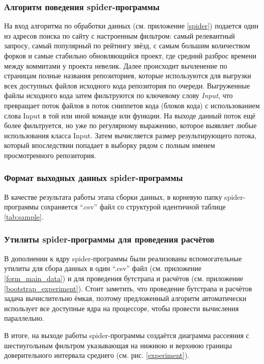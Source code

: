 \subsubsection*{Алгоритм поведения spider-программы}
На вход алгоритма по обработки данных (см. приложение \ref{spider}) подается один из адресов поиска по сайту с настроенным фильтром: самый релевантный запросу, самый популярный по рейтингу звёзд, с самым большим количеством форков и самые стабильно обновляющийся проект, где средний разброс времени между коммитами у проекта невелик. Далее происходит вычленение по страницам полные названия репозиториев, которые используются для выгрузки всех доступных файлов исходного кода репозитория по очереди. Выгруженные файлы исходного кода затем фильтруются по ключевому слову \textit{Input}, что превращает поток файлов в поток сниппетов кода (блоков кода) с использованием слова Input в той или иной команде или функции. На выходе данный поток ещё более фильтруется, но уже по регулярному выражению, которое выявляет любые использования класса Input. Затем вычисляется размер результирующего потока, который впоследствии попадает в выборку рядом с полным именем просмотренного репозитория.

\subsubsection*{Формат выходных данных spider-программы}
В качестве результата работы этапа сборки данных, в корневую папку spider-программы сохраняется ``.csv'' файл со структурой идентичной таблице \ref{tab:sample}.

\subsubsection*{Утилиты spider-программы для проведения расчётов}
В дополнении к ядру spider-программы были реализованы вспомогательные утилиты для сбора данных в один ``.csv'' файл (см. приложение \ref{form_main_data}) и для проведения бутстрапа и расчётов (см. приложение \ref{bootstrap_experiment}). Стоит заметить, что проведение бутстрапа и расчётов задача вычислительно ёмкая, поэтому предложенный алгоритм автоматически использует все доступные ядра на процессоре, чтобы провести вычисления параллельно. 

В итоге, на выходе работы spider-программы создаётся диаграмма рассеяния с шестиугольным фильтром указывающая на нижнюю и верхнюю границы доверительного интервала среднего (см. рис. \ref{experiment}).

